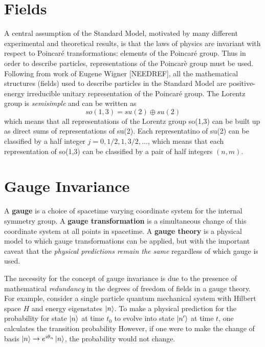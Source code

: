 \section{Fields}
A central assumption of the Standard Model, motivated by many different experimental and theoretical results, is that the laws of physics are invariant with respect to Poincar\'{e} transformations: elements of the Poincar\'{e} group.
Thus in order to describe particles, representations of the Poincar\`{e} group must be used.
Following from work of Eugene Wigner [NEEDREF], all the mathematical structures (fields) used to describe particles in the Standard Model are positive-energy irreducible unitary representation of the Poincar\'{e} group.
The Lorentz group is \textit{semisimple} and can be written as
\begin{equation}
    so(1,3) = su(2) \oplus su(2)
\end{equation}
which means that all representations of the Lorentz group so(1,3) can be built up as direct sums of representations of su(2).
Each representatino of su(2) can be classified by a half integer $j = 0,1/2,1,3/2,\dots$, which means that each representation of so(1,3) can be classified by a pair of half integers $(n,m)$.


\section{Gauge Invariance}
A \textbf{gauge} is a choice of spacetime varying coordinate system for the internal symmetry group.
A \textbf{gauge transformation} is a simultaneous change of this coordinate system at all points in spacetime.
A \textbf{gauge theory} is a physical model to which gauge transformations can be applied, but with the important caveat that the \textit{physical predictions remain the same} regardless of which gauge is used.

The necessity for the concept of gauge invariance is due to the presence of mathematical \textit{redundancy} in the degrees of freedom of fields in a gauge theory.
For example, consider a single particle quantum mechanical system with Hilbert space $H$ and energy eigenstates $\ket{n}$.
To make a physical prediction for the probability for state $\ket{n}$ at time $t_0$ to evolve into state $\ket{n^\prime}$ at time $t$, one calculates the transition probability %
However, if one were to make the change of basis $\ket{n} \rightarrow e^{i\theta_n} \ket{n}$, the probability would not change.

